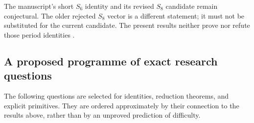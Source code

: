 \documentclass[11pt,a4paper]{article}
\numberwithin{equation}{section}
\theoremstyle{plain}
\theoremstyle{definition}
\theoremstyle{remark}
\begin{document}
The manuscript's short $S_6$ identity and its revised $S_8$ candidate
remain conjectural. The older rejected $S_8$ vector is a different
statement; it must not be substituted for the current candidate. The
present results neither prove nor refute those period identities
\cite[README and editorial ledger]{Repo}.

\subsection{A proposed programme of exact research questions}

The following questions are selected for identities, reduction theorems,
and explicit primitives. They are ordered approximately by their
connection to the results above, rather than by an unproved prediction
of difficulty.
\end{document}
